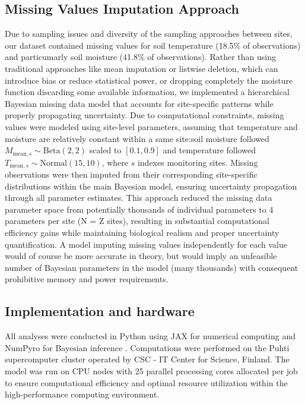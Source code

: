 \documentclass[12pt,a4paper]{article}
\begin{document}
\subsection{Missing Values Imputation Approach}
Due to sampling issues and diversity of the sampling approaches between sites, our dataset contained missing values for soil temperature (18.5\% of observations) and particumarly soil moisture (41.8\% of observations). Rather than using traditional approaches like mean imputation or listwise deletion, which can introduce bias or reduce statistical power, or dropping completely the moisture function discarding some available information, we implemented a hierarchical Bayesian missing data model that accounts for site-specific patterns while properly propagating uncertainty.
Due to computational constraints, missing values were modeled using site-level parameters, assuming that temperature and moisture are relatively constant within a same site:soil moisture followed $M_{\text{mean},s} \sim \text{Beta}(2,2)$ scaled to $[0.1, 0.9]$ and temperature followed $T_{\text{mean},s} \sim \text{Normal}(15, 10)$, where $s$ indexes monitoring sites.
Missing observations were then imputed from their corresponding site-specific distributions within the main Bayesian model, ensuring uncertainty propagation through all parameter estimates. This approach reduced the missing data parameter space from potentially thousands of individual parameters to 4 parameters per site (N = Z sites), resulting in substantial computational efficiency gains while maintaining biological realism and proper uncertainty quantification. A model imputing missing values independently for each value would of course be more accurate in theory, but would imply an unfeasible number of Bayesian parameters in the model (many thousands) with consequent prohibitive memory and power requirements.



\subsection{Implementation and hardware}\label{sec:implementation}

All analyses were conducted in Python using JAX for numerical computing and NumPyro for Bayesian inference \citep{phan2019composable}. Computations were performed on the Puhti supercomputer cluster operated by CSC - IT Center for Science, Finland. The model was run on CPU nodes with 25 parallel processing cores allocated per job to ensure computational efficiency and optimal resource utilization within the high-performance computing environment.
\end{document}
